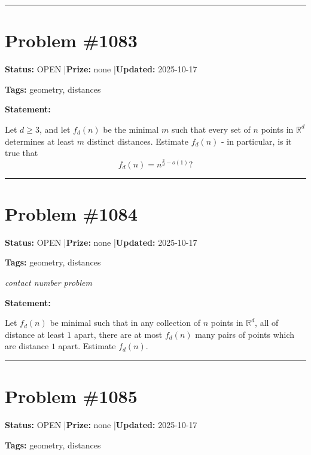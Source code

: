 \documentclass{article}
\begin{document}
\noindent\rule{\linewidth}{0.4pt}


\section{Problem \#1083}
\label{prob:1083}

\noindent\textbf{Status:} OPEN \quad|\quad \textbf{Prize:} none \quad|\quad \textbf{Updated:} 2025-10-17

\noindent\textbf{Tags:} geometry, distances

\medskip

\noindent\textbf{Statement:}

Let $d\geq 3$, and let $f_d(n)$ be the minimal $m$ such that every set of $n$ points in $\mathbb{R}^d$ determines at least $m$ distinct distances. Estimate $f_d(n)$ - in particular, is it true that\[f_d(n)=n^{\frac{2}{d}-o(1)}?\]

\noindent\rule{\linewidth}{0.4pt}


\section{Problem \#1084}
\label{prob:1084}

\noindent\textbf{Status:} OPEN \quad|\quad \textbf{Prize:} none \quad|\quad \textbf{Updated:} 2025-10-17

\noindent\textbf{Tags:} geometry, distances

\medskip
\noindent\textit{contact number problem}


\noindent\textbf{Statement:}

Let $f_d(n)$ be minimal such that in any collection of $n$ points in $\mathbb{R}^d$, all of distance at least $1$ apart, there are at most $f_d(n)$ many pairs of points which are distance $1$ apart. Estimate $f_d(n)$.

\noindent\rule{\linewidth}{0.4pt}


\section{Problem \#1085}
\label{prob:1085}

\noindent\textbf{Status:} OPEN \quad|\quad \textbf{Prize:} none \quad|\quad \textbf{Updated:} 2025-10-17

\noindent\textbf{Tags:} geometry, distances
\end{document}

